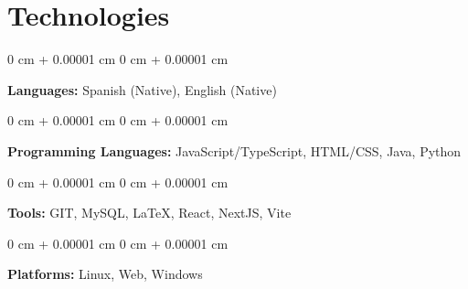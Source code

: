 \documentclass[10pt, letterpaper]{article}
\newenvironment{onecolentry}{
    \begin{adjustwidth}{
        0 cm + 0.00001 cm
    }{
        0 cm + 0.00001 cm
    }
}{
    \end{adjustwidth}
} %
\begin{document}
    \section{Technologies}
        \begin{onecolentry}
            \textbf{Languages:} Spanish (Native), English (Native)
        \end{onecolentry}
        \vspace{0.2 cm}
        \begin{onecolentry}
            \textbf{Programming Languages:} JavaScript/TypeScript, HTML/CSS, Java, Python
        \end{onecolentry}
        \vspace{0.2 cm}
        \begin{onecolentry}
            \textbf{Tools:} GIT, MySQL, LaTeX, React, NextJS, Vite
        \end{onecolentry}
        \vspace{0.2 cm}
        \begin{onecolentry}
            \textbf{Platforms:} Linux, Web, Windows
        \end{onecolentry}
\end{document}
